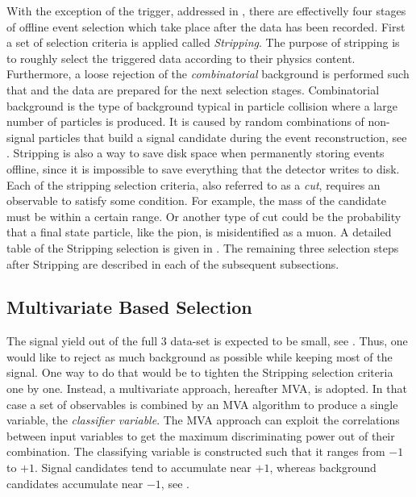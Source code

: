 
With the exception of the trigger, addressed in , there are effectivelly four stages of offline event
selection which take place after the data has been recorded.
First a set of selection criteria is applied called {\it Stripping}. The purpose of stripping is to roughly
select the triggered data according to their physics content. Furthermore, a loose rejection of the {\it combinatorial}
background is performed such that and the data are prepared for the next selection stages.
Combinatorial background is the type of background typical in particle collision where a large number of
particles is produced. It is caused by random combinations of non-signal particles that build a signal
candidate during the event reconstruction, see .
Stripping is also a way to save disk space when permanently storing events offline, since it is impossible
to save everything that the detector writes to disk. Each of the stripping selection criteria, also referred to as a {\it cut},
requires an observable to satisfy some condition. For example, the mass of the \Bs candidate must be within
a certain range. Or another type of cut could be the probability that a final state particle, like the pion, is misidentified
as a muon. A detailed table of the Stripping selection is given in . The remaining three selection
steps after Stripping are described in each of the subsequent subsections.

\subsection{Multivariate Based Selection}
\label{Multivariate_Based_Selection}

The \BsJpsiKst signal yield out of the full 3 \invfb data-set is expected to be small, see . Thus, one would like to
reject as much background as possible while keeping most of the signal. One way to do that would be to tighten the Stripping
selection criteria one by one. Instead, a multivariate approach, hereafter MVA, is adopted.
In that case a set of observables is combined by an MVA algorithm to produce a single variable, the {\it classifier variable}.
The MVA approach can exploit the correlations between input variables to get the maximum discriminating power out of their combination.
The classifying variable is constructed such that it ranges from $-1$ to $+1$. Signal candidates tend to accumulate near $+1$,
whereas background candidates accumulate near $-1$, see .

